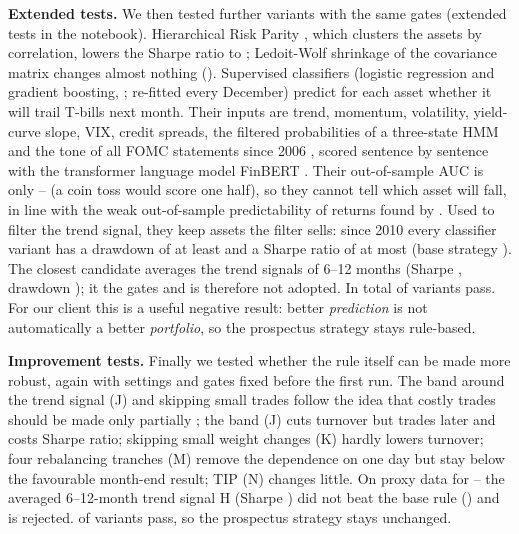\textbf{Extended tests.} We then tested  further variants with the same gates (extended tests in the notebook). Hierarchical Risk Parity \citep{lopezdeprado2016}, which clusters the assets by correlation, lowers the
Sharpe ratio to ; Ledoit-Wolf shrinkage of the covariance matrix \citep{ledoit2004} changes almost
nothing (). Supervised classifiers (logistic regression and gradient boosting, \citealp{friedman2001}; re-fitted every December)
predict for each asset whether it will trail T-bills next month. Their inputs are trend, momentum, volatility,
yield-curve slope, VIX, credit spreads, the filtered probabilities of a three-state HMM and the tone of all
 FOMC statements since 2006 \citep[a text source shown to move markets;][]{hansen2016}, scored sentence by sentence with the transformer language model FinBERT
\citep{araci2019}. Their out-of-sample AUC is only -- (a coin toss would score one half), so they
cannot tell which asset will fall, in line with the weak out-of-sample predictability of returns found by \citet{welch2008}. Used to filter the trend signal, they keep assets the filter sells: since 2010 every
classifier variant has a drawdown of at least  and a Sharpe ratio of at most
 (base strategy ). The closest candidate averages the trend signals of
6--12 months (Sharpe , drawdown ); it  the gates and is therefore
not adopted. In total  of  variants pass. For our client this is a useful
negative result: better \emph{prediction} is not automatically a better \emph{portfolio}, so the prospectus strategy stays
rule-based.

\textbf{Improvement tests.} Finally we tested whether the rule itself can be made more robust, again with settings and
gates fixed before the first run. The band around the trend signal (J) and skipping small trades follow the idea that costly trades should be made only partially \citep{garleanu2013}; the band (J) cuts turnover but
trades later and costs Sharpe ratio; skipping small weight changes (K) hardly lowers turnover; four rebalancing tranches
(M) remove the dependence on one day but stay below the favourable month-end result; TIP (N) changes little. On proxy
data for -- the averaged 6--12-month trend signal H (Sharpe )
did not beat the base rule () and is rejected.  of  variants
pass, so the prospectus strategy stays unchanged.
